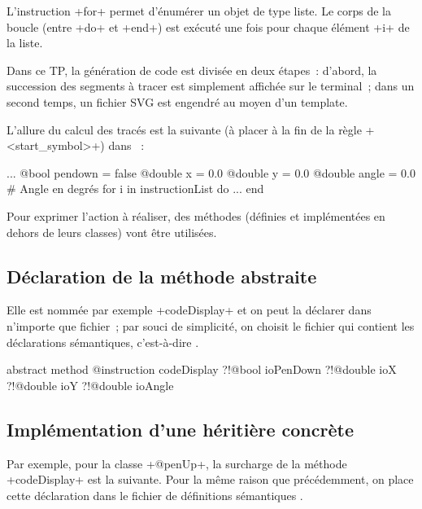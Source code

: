 L'instruction \ggst+for+ permet d’énumérer un objet de type liste. Le corps de la boucle (entre \ggst+do+ et \ggst+end+) est exécuté une fois pour chaque élément \ggst+i+ de la liste.









Dans ce TP, la génération de code est divisée en deux étapes~: d'abord, la succession des segments à tracer est simplement affichée sur le terminal~; dans un second temps, un fichier SVG est engendré au moyen d'un template.

L'allure du calcul des tracés est la suivante (à placer à la fin de la règle \ggst+<start_symbol>+) dans ~:

\begin{galgas3}
  ...
  @bool pendown = false
  @double x = 0.0
  @double y = 0.0
  @double angle = 0.0 # Angle en degrés
  for i in instructionList do
    ...
  end
\end{galgas3}

Pour exprimer l'action à réaliser, des méthodes (définies et implémentées en dehors de leurs classes) vont être utilisées.

\subsection{Déclaration de la méthode abstraite}
Elle est nommée par exemple \ggst+codeDisplay+ et on peut la déclarer dans n'importe que fichier~; par souci de simplicité, on choisit le fichier qui contient les déclarations sémantiques, c'est-à-dire .

\begin{galgas3}
abstract method @instruction codeDisplay
  ?!@bool ioPenDown
  ?!@double ioX
  ?!@double ioY
  ?!@double ioAngle
\end{galgas3}

\subsection{Implémentation d'une héritière concrète}

Par exemple, pour la classe \ggst+@penUp+, la surcharge de la méthode \ggst+codeDisplay+ est la suivante. Pour la même raison que précédemment, on place cette déclaration dans le fichier de définitions sémantiques .


